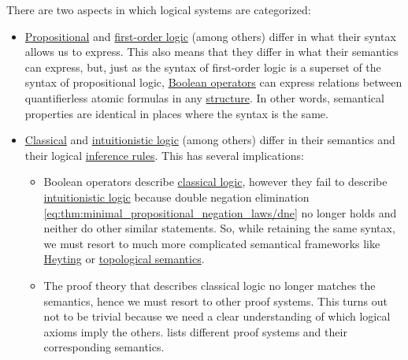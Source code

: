There are two aspects in which logical systems are categorized:
\begin{itemize}
  \item \hyperref[subsec:propositional_logic]{Propositional} and \hyperref[subsec:first_order_logic]{first-order logic} (among others) differ in what their syntax allows us to express. This also means that they differ in what their semantics can express, but, just as the syntax of first-order logic is a superset of the syntax of propositional logic, \hyperref[subsec:boolean_operators]{Boolean operators} can express relations between quantifierless atomic formulas in any \hyperref[def:first_order_structure]{structure}. In other words, semantical properties are identical in places where the syntax is the same.

  \item \hyperref[rem:classical_logic]{Classical} and \hyperref[rem:intuitionistic_logic]{intuitionistic logic} (among others) differ in their semantics and their logical \hyperref[def:judgment/inference_rule]{inference rules}. This has several implications:
  \begin{itemize}
     \item Boolean operators describe \hyperref[rem:classical_logic]{classical logic}, however they fail to describe \hyperref[rem:intuitionistic_logic]{intuitionistic logic} because double negation elimination \eqref{eq:thm:minimal_propositional_negation_laws/dne} no longer holds and neither do other similar statements. So, while retaining the same syntax, we must resort to much more complicated semantical frameworks like \hyperref[def:propositional_heyting_algebra_semantics]{Heyting} or \hyperref[def:propositional_topological_semantics]{topological semantics}.

     \item The proof theory that describes classical logic no longer matches the semantics, hence we must resort to other proof systems. This turns out not to be trivial because we need a clear understanding of which logical axioms imply the others.  lists different proof systems and their corresponding semantics.
  \end{itemize}
\end{itemize}


